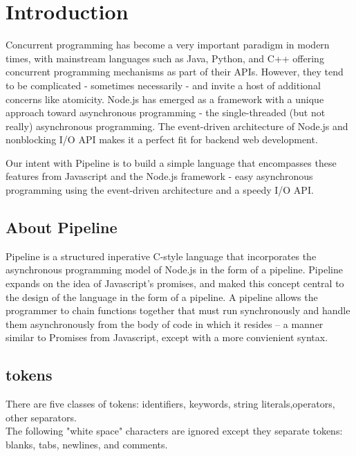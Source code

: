 \documentclass[./LRM_main.tex]{subfiles}
\begin{document}


\chapter{Introduction}
Concurrent programming has become a very important paradigm in 
modern times, with mainstream languages such as Java, Python, and C++ offering 
concurrent programming mechanisms as part of their APIs. However, they tend to 
be complicated - sometimes necessarily - and invite a host of additional 
concerns like atomicity. Node.js has emerged as a framework with a unique approach toward asynchronous 
programming - the single-threaded (but not really) asynchronous programming. 
The event-driven architecture of Node.js and nonblocking I/O API makes it a 
perfect fit for backend web development.

Our intent with Pipeline is to build a simple language that encompasses these features from 
Javascript and the Node.js framework - easy asynchronous programming using the 
event-driven architecture and a speedy I/O API.

\section{About Pipeline}
Pipeline is a structured inperative C-style language that incorporates the asynchronous programming model of Node.js in the form of a pipeline. Pipeline expands on the idea of Javascript's promises, and maked this concept central to the design of the language in the form of a pipeline. A pipeline allows the programmer to chain functions together that must run synchronously and handle them asynchronously from the body of code in which it resides -- a manner similar to Promises from Javascript, except with a more convienient syntax. 

\section{tokens}
There are five classes of tokens:
identifiers, keywords, string literals,operators, other separators.\\
The following "white space" characters are ignored except they separate tokens: blanks, tabs, newlines, and comments.\\
\end{document}
